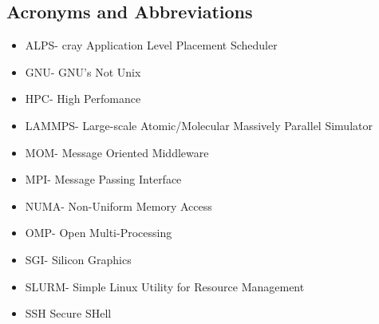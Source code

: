 \subsection{Acronyms and Abbreviations}

\begin{itemize}
\item ALPS- cray Application Level Placement Scheduler
\item GNU- GNU's Not Unix
\item HPC- High Perfomance
\item LAMMPS- Large-scale Atomic/Molecular Massively Parallel Simulator
\item MOM- Message Oriented Middleware
\item MPI- Message Passing Interface
\item NUMA- Non-Uniform Memory Access
\item OMP- Open Multi-Processing
\item SGI- Silicon Graphics
\item SLURM- Simple Linux Utility for Resource Management
\item SSH Secure SHell
\end{itemize}
